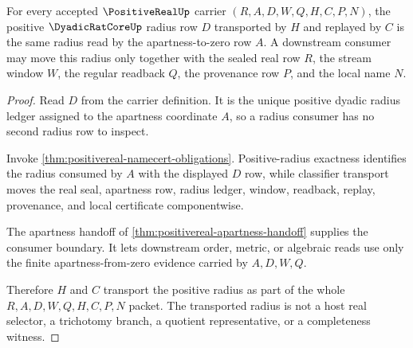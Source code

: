\begin{theorem}
\label{thm:positivereal-apartness-radius-transport}
For every accepted $\PositiveRealUp$ carrier $(R,A,D,W,Q,H,C,P,N)$, the positive $\DyadicRatCoreUp$ radius row $D$ transported by $H$ and replayed by $C$ is the same radius read by the apartness-to-zero row $A$. A downstream consumer may move this radius only together with the sealed real row $R$, the stream window $W$, the regular readback $Q$, the provenance row $P$, and the local name $N$.
\end{theorem}
\begin{proof}
Read $D$ from the carrier definition. It is the unique positive dyadic radius ledger assigned to the apartness coordinate $A$, so a radius consumer has no second radius row to inspect.

Invoke \autoref{thm:positivereal-namecert-obligations}. Positive-radius exactness identifies the radius consumed by $A$ with the displayed $D$ row, while classifier transport moves the real seal, apartness row, radius ledger, window, readback, replay, provenance, and local certificate componentwise.

The apartness handoff of \autoref{thm:positivereal-apartness-handoff} supplies the consumer boundary. It lets downstream order, metric, or algebraic reads use only the finite apartness-from-zero evidence carried by $A,D,W,Q$.

Therefore $H$ and $C$ transport the positive radius as part of the whole $R,A,D,W,Q,H,C,P,N$ packet. The transported radius is not a host real selector, a trichotomy branch, a quotient representative, or a completeness witness.
\end{proof}

